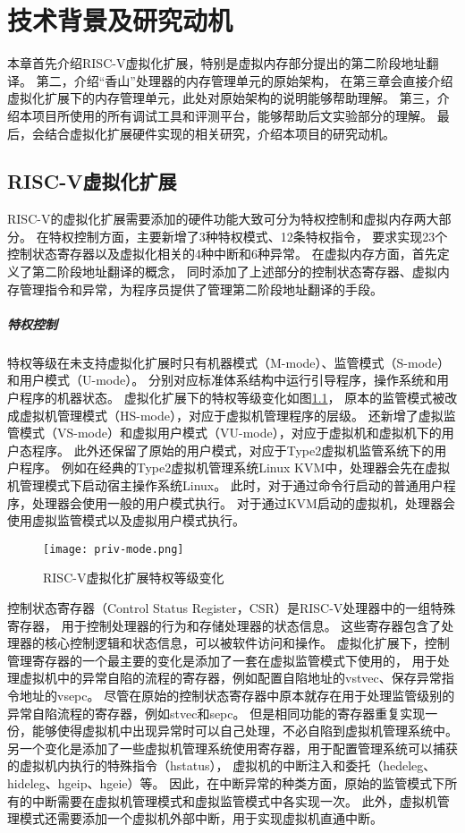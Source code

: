 \chapter{技术背景及研究动机}

本章首先介绍RISC-V虚拟化扩展，特别是虚拟内存部分提出的第二阶段地址翻译。
第二，介绍“香山”处理器的内存管理单元的原始架构，
在第三章会直接介绍虚拟化扩展下的内存管理单元，此处对原始架构的说明能够帮助理解。
第三，介绍本项目所使用的所有调试工具和评测平台，能够帮助后文实验部分的理解。
最后，会结合虚拟化扩展硬件实现的相关研究，介绍本项目的研究动机。

\section{RISC-V虚拟化扩展}
RISC-V的虚拟化扩展需要添加的硬件功能大致可分为特权控制和虚拟内存两大部分。
在特权控制方面，主要新增了3种特权模式、12条特权指令，
要求实现23个控制状态寄存器以及虚拟化相关的4种中断和6种异常。
在虚拟内存方面，首先定义了第二阶段地址翻译的概念，
同时添加了上述部分的控制状态寄存器、虚拟内存管理指令和异常，为程序员提供了管理第二阶段地址翻译的手段。

\paragraph{特权控制}
特权等级在未支持虚拟化扩展时只有机器模式（M-mode）、监管模式（S-mode）和用户模式（U-mode）。
分别对应标准体系结构中运行引导程序，操作系统和用户程序的机器状态。
虚拟化扩展下的特权等级变化如图\ref*{fig:priv-mode}，
原本的监管模式被改成虚拟机管理模式（HS-mode），对应于虚拟机管理程序的层级。
还新增了虚拟监管模式（VS-mode）和虚拟用户模式（VU-mode），对应于虚拟机和虚拟机下的用户态程序。
此外还保留了原始的用户模式，对应于Type2虚拟机监管系统下的用户程序。
例如在经典的Type2虚拟机管理系统Linux KVM中，处理器会先在虚拟机管理模式下启动宿主操作系统Linux。
此时，对于通过命令行启动的普通用户程序，处理器会使用一般的用户模式执行。
对于通过KVM启动的虚拟机，处理器会使用虚拟监管模式以及虚拟用户模式执行。

\begin{figure}[htbp]
    \centering
    \texttt{[image: priv-mode.png]}
    \caption{RISC-V虚拟化扩展特权等级变化}
    \label{fig:priv-mode}
\end{figure}

控制状态寄存器（Control Status Register，CSR）是RISC-V处理器中的一组特殊寄存器，
用于控制处理器的行为和存储处理器的状态信息。
这些寄存器包含了处理器的核心控制逻辑和状态信息，可以被软件访问和操作。
虚拟化扩展下，控制管理寄存器的一个最主要的变化是添加了一套在虚拟监管模式下使用的，
用于处理虚拟机中的异常自陷的流程的寄存器，例如配置自陷地址的vstvec、保存异常指令地址的vsepc。
尽管在原始的控制状态寄存器中原本就存在用于处理监管级别的异常自陷流程的寄存器，例如stvec和sepc。
但是相同功能的寄存器重复实现一份，能够使得虚拟机中出现异常时可以自己处理，不必自陷到虚拟机管理系统中。
另一个变化是添加了一些虚拟机管理系统使用寄存器，用于配置管理系统可以捕获的虚拟机内执行的特殊指令（hstatus），
虚拟机的中断注入和委托（hedeleg、hideleg、hgeip、hgeie）等。
因此，在中断异常的种类方面，原始的监管模式下所有的中断需要在虚拟机管理模式和虚拟监管模式中各实现一次。
此外，虚拟机管理模式还需要添加一个虚拟机外部中断，用于实现虚拟机直通中断。

